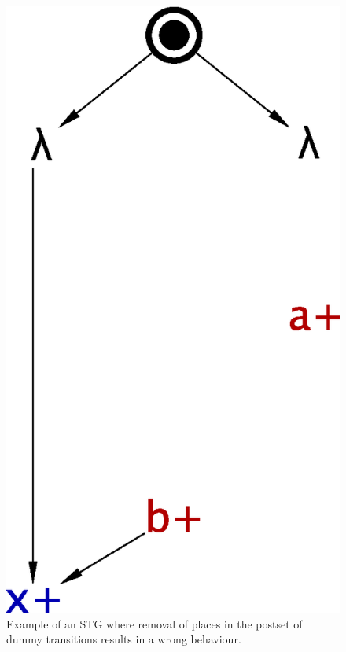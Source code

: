 \begin{figure}[!tb]
    \includegraphics[scale=0.3]{EXPERIMENTS/stg/dummy_counterexample_removed}%
    \hfill%
    {}
    \caption{\label{fi-dummy-counterexample}
        Example of an STG where removal of places in the postset of dummy transitions results in a wrong behaviour.
    }
\end{figure}


